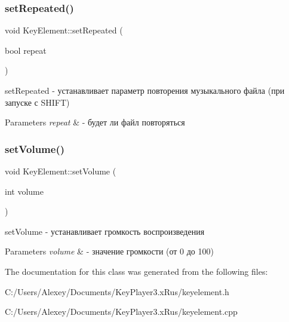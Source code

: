 \subsubsection{\texorpdfstring{set\+Repeated()}{setRepeated()}}
{\footnotesize\ttfamily void Key\+Element\+::set\+Repeated (\begin{DoxyParamCaption}\item[{bool}]{repeat }\end{DoxyParamCaption})}



set\+Repeated -\/ устанавливает параметр повторения музыкального файла (при запуске с S\+H\+I\+FT) 


\begin{DoxyParams}{Parameters}
{\em repeat} & -\/ будет ли файл повторяться \\
\hline
\end{DoxyParams}
\mbox{\label{class_key_element_ae702f4dcd7becbce1737e6f4f3f69afe}} 
\subsubsection{\texorpdfstring{set\+Volume()}{setVolume()}}
{\footnotesize\ttfamily void Key\+Element\+::set\+Volume (\begin{DoxyParamCaption}\item[{int}]{volume }\end{DoxyParamCaption})}



set\+Volume -\/ устанавливает громкость воспроизведения 


\begin{DoxyParams}{Parameters}
{\em volume} & -\/ значение громкости (от 0 до 100) \\
\hline
\end{DoxyParams}


The documentation for this class was generated from the following files\+:\begin{DoxyCompactItemize}
\item 
C\+:/\+Users/\+Alexey/\+Documents/\+Key\+Player3.\+x\+Rus/keyelement.\+h\item 
C\+:/\+Users/\+Alexey/\+Documents/\+Key\+Player3.\+x\+Rus/keyelement.\+cpp\end{DoxyCompactItemize}
